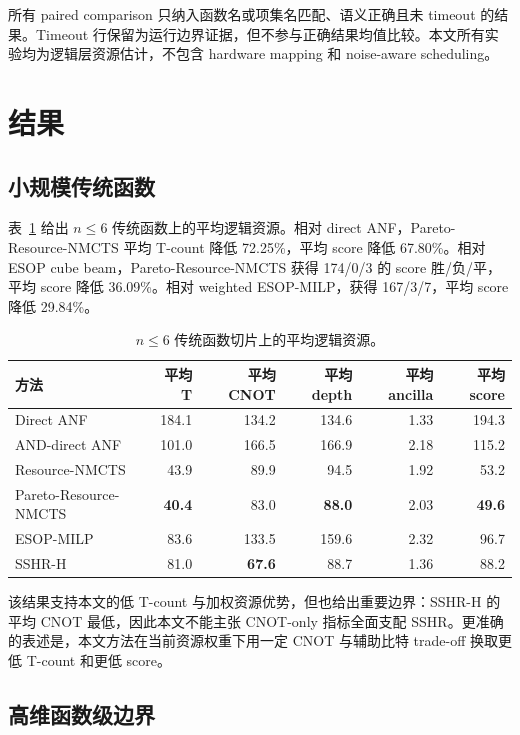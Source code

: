 \documentclass[UTF8,fontset=macnew,11pt]{ctexart}
\newcommand{\method}{Resource-NMCTS}
\newcommand{\pareto}{Pareto-Resource-NMCTS}
\begin{document}
所有 paired comparison 只纳入函数名或项集名匹配、语义正确且未 timeout 的结果。Timeout 行保留为运行边界证据，但不参与正确结果均值比较。本文所有实验均为逻辑层资源估计，不包含 hardware mapping 和 noise-aware scheduling。

\section{结果}

\subsection{小规模传统函数}

表~\ref{tab:traditional} 给出 $n\leq6$ 传统函数上的平均逻辑资源。相对 direct ANF，\pareto{} 平均 T-count 降低 72.25\%，平均 score 降低 67.80\%。相对 ESOP cube beam，\pareto{} 获得 174/0/3 的 score 胜/负/平，平均 score 降低 36.09\%。相对 weighted ESOP-MILP，获得 167/3/7，平均 score 降低 29.84\%。

\begin{table}[t]
\centering
\small
\caption{$n\leq6$ 传统函数切片上的平均逻辑资源。}
\label{tab:traditional}
\begin{tabular}{lrrrrr}
\toprule
方法 & 平均 T & 平均 CNOT & 平均 depth & 平均 ancilla & 平均 score \\
\midrule
Direct ANF & 184.1 & 134.2 & 134.6 & 1.33 & 194.3 \\
AND-direct ANF & 101.0 & 166.5 & 166.9 & 2.18 & 115.2 \\
\method{} & 43.9 & 89.9 & 94.5 & 1.92 & 53.2 \\
\pareto{} & \textbf{40.4} & 83.0 & \textbf{88.0} & 2.03 & \textbf{49.6} \\
ESOP-MILP & 83.6 & 133.5 & 159.6 & 2.32 & 96.7 \\
SSHR-H & 81.0 & \textbf{67.6} & 88.7 & 1.36 & 88.2 \\
\bottomrule
\end{tabular}
\end{table}

该结果支持本文的低 T-count 与加权资源优势，但也给出重要边界：SSHR-H 的平均 CNOT 最低，因此本文不能主张 CNOT-only 指标全面支配 SSHR。更准确的表述是，本文方法在当前资源权重下用一定 CNOT 与辅助比特 trade-off 换取更低 T-count 和更低 score。

\subsection{高维函数级边界}
\end{document}
